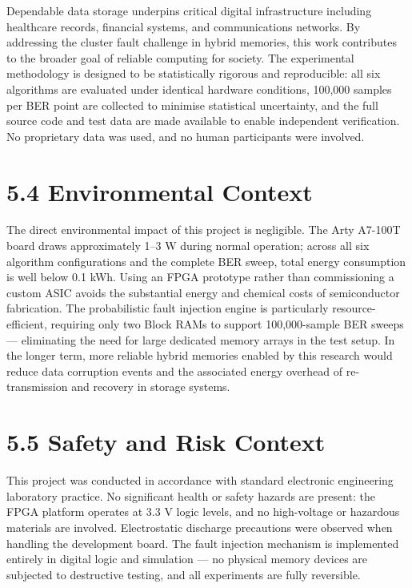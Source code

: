 \documentclass[
  english,
  12pt,
]{report}
\begin{document}
Dependable data storage underpins critical digital infrastructure
including healthcare records, financial systems, and communications
networks. By addressing the cluster fault challenge in hybrid memories,
this work contributes to the broader goal of reliable computing for
society. The experimental methodology is designed to be statistically
rigorous and reproducible: all six algorithms are evaluated under
identical hardware conditions, 100,000 samples per BER point are
collected to minimise statistical uncertainty, and the full source code
and test data are made available to enable independent verification. No
proprietary data was used, and no human participants were involved.

\section{5.4 Environmental Context}\label{environmental-context}

The direct environmental impact of this project is negligible. The Arty
A7-100T board draws approximately 1--3 W during normal operation; across
all six algorithm configurations and the complete BER sweep, total
energy consumption is well below 0.1 kWh. Using an FPGA prototype rather
than commissioning a custom ASIC avoids the substantial energy and
chemical costs of semiconductor fabrication. The probabilistic fault
injection engine is particularly resource-efficient, requiring only two
Block RAMs to support 100,000-sample BER sweeps --- eliminating the need
for large dedicated memory arrays in the test setup. In the longer term,
more reliable hybrid memories enabled by this research would reduce data
corruption events and the associated energy overhead of re-transmission
and recovery in storage systems.

\section{5.5 Safety and Risk Context}\label{safety-and-risk-context}

This project was conducted in accordance with standard electronic
engineering laboratory practice. No significant health or safety hazards
are present: the FPGA platform operates at 3.3 V logic levels, and no
high-voltage or hazardous materials are involved. Electrostatic
discharge precautions were observed when handling the development board.
The fault injection mechanism is implemented entirely in digital logic
and simulation --- no physical memory devices are subjected to
destructive testing, and all experiments are fully reversible.
\end{document}
